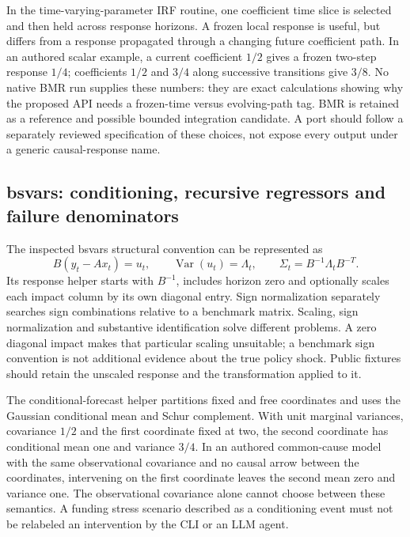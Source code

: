 In the time-varying-parameter IRF routine, one coefficient time slice is selected and then held across response horizons. A frozen local response is useful, but differs from a response propagated through a changing future coefficient path. In an authored scalar example, a current coefficient $1/2$ gives a frozen two-step response $1/4$; coefficients $1/2$ and $3/4$ along successive transitions give $3/8$. No native BMR run supplies these numbers: they are exact calculations showing why the proposed API needs a frozen-time versus evolving-path tag. BMR is retained as a reference and possible bounded integration candidate. A port should follow a separately reviewed specification of these choices, not expose every output under a generic causal-response name.\citep{exec25_cdyn_bmr,exec25_cdyn_choice}

\subsection{bsvars: conditioning, recursive regressors and failure denominators}

The inspected bsvars structural convention can be represented as
\[
 B\left(y_t-Ax_t\right)=u_t,\qquad
 \operatorname{Var}(u_t)=\Lambda_t,
 \qquad \Sigma_t=B^{-1}\Lambda_tB^{-T}.
\]
Its response helper starts with $B^{-1}$, includes horizon zero and optionally scales each impact column by its own diagonal entry. Sign normalization separately searches sign combinations relative to a benchmark matrix. Scaling, sign normalization and substantive identification solve different problems. A zero diagonal impact makes that particular scaling unsuitable; a benchmark sign convention is not additional evidence about the true policy shock. Public fixtures should retain the unscaled response and the transformation applied to it.\citep{exec25_cdyn_bsvars}

The conditional-forecast helper partitions fixed and free coordinates and uses the Gaussian conditional mean and Schur complement. With unit marginal variances, covariance $1/2$ and the first coordinate fixed at two, the second coordinate has conditional mean one and variance $3/4$. In an authored common-cause model with the same observational covariance and no causal arrow between the coordinates, intervening on the first coordinate leaves the second mean zero and variance one. The observational covariance alone cannot choose between these semantics. A funding stress scenario described as a conditioning event must not be relabeled an intervention by the CLI or an LLM agent.\citep{exec25_cdyn_bsvars,exec25_cdyn_choice}

